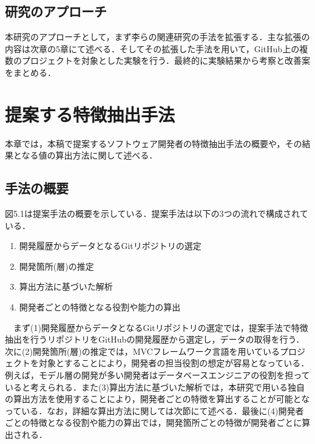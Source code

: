 \documentclass{funthesis}
\begin{document}
\section{研究のアプローチ}
本研究のアプローチとして，まず李ら\cite{risyo}の関連研究の手法を拡張する．主な拡張の内容は次章の5章にて述べる．そしてその拡張した手法を用いて，GitHub上の複数のプロジェクトを対象とした実験を行う．最終的に実験結果から考察と改善案をまとめる．

\chapter{提案する特徴抽出手法}

本章では，本稿で提案するソフトウェア開発者の特徴抽出手法の概要や，その結果となる値の算出方法に関して述べる．
\section{手法の概要}
図5.1は提案手法の概要を示している．提案手法は以下の3つの流れで構成されている．

\begin{enumerate}
\renewcommand{\labelenumi}{(\arabic{enumi})}
 \item 開発履歴からデータとなるGitリポジトリの選定
 \item 開発箇所(層)の推定
 \item 算出方法に基づいた解析
 \item 開発者ごとの特徴となる役割や能力の算出
\end{enumerate}
　まず(1)開発履歴からデータとなるGitリポジトリの選定では，提案手法で特徴抽出を行うリポジトリをGitHubの開発履歴から選定し，データの取得を行う．次に(2)開発箇所(層)の推定では，MVCフレームワーク言語を用いているプロジェクトを対象とすることにより，開発者の担当役割の想定が容易となっている．例えば，モデル層の開発が多い開発者はデータベースエンジニアの役割を担っていると考えられる．また(3)算出方法に基づいた解析では，本研究で用いる独自の算出方法を使用することにより，開発者ごとの特徴を算出することが可能となっている．なお，詳細な算出方法に関しては次節にて述べる．最後に(4)開発者ごとの特徴となる役割や能力の算出では，開発箇所ごとの特徴が開発者ごとに算出される．
 
\end{document}

